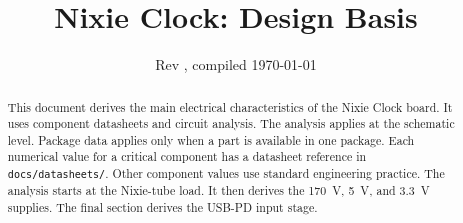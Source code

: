 \documentclass[11pt,letterpaper]{article}
\title{Nixie Clock: Design Basis}
\author{}
\date{Rev \DesignRev{}, compiled \today}
\begin{document}
\maketitle

\begin{abstract}
\noindent
This document derives the main electrical characteristics of the Nixie Clock
board. It uses component datasheets and circuit analysis. The analysis applies
at the schematic level. Package data applies only when a part is available in
one package. Each numerical value for a critical component has a datasheet
reference in \texttt{docs/datasheets/}. Other component values use standard
engineering practice. The analysis starts at the Nixie-tube load. It then
derives the 170~V, 5~V, and 3.3~V supplies. The final section derives the
USB-PD input stage.
\end{abstract}

\tableofcontents
\listoftables
\listoffigures











\end{document}
